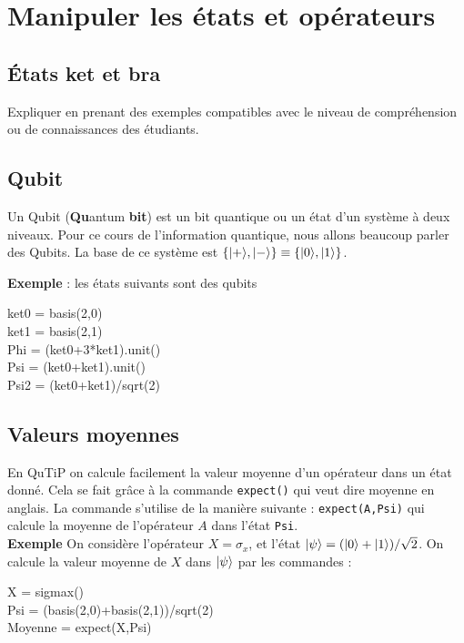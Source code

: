 \section{Manipuler les états et opérateurs}

\subsection{États ket et bra}

Expliquer en prenant des exemples compatibles avec le niveau de compréhension
ou de connaissances des étudiants.

\subsection{Qubit}

Un Qubit (\textbf{Qu}antum \textbf{bit}) est un bit quantique ou un état d'un système à deux niveaux. Pour ce cours de l'information quantique, nous allons beaucoup parler des Qubits. La base de ce système est $\{\vert+\rangle,\vert-\rangle\}\equiv\{\vert0\rangle,\vert1\rangle\}$.

\textbf{Exemple} : les états suivants sont des qubits\\
\begin{tt}
ket0 = basis(2,0) \\
ket1 = basis(2,1)\\
Phi = (ket0+3*ket1).unit()\\
Psi = (ket0+ket1).unit()\\
Psi2 = (ket0+ket1)/sqrt(2)\\
\end{tt}

\subsection{Valeurs moyennes}

En QuTiP on calcule facilement la valeur moyenne d'un opérateur dans un état donné. Cela se fait grâce à la commande \texttt{expect()} qui veut dire moyenne en anglais. La commande s'utilise de la manière suivante : \texttt{expect(A,Psi)} qui calcule la moyenne de l'opérateur $A$ dans l'état \texttt{Psi}.\\
\textbf{Exemple}
On considère l'opérateur $X=\sigma_x$, et l'état $\vert\psi\rangle=(\vert0\rangle+\vert1\rangle)/\sqrt{2}$. On calcule la valeur moyenne de $X$ dans $\vert\psi\rangle$ par les commandes :\\
\begin{tt}
X = sigmax()\\
Psi = (basis(2,0)+basis(2,1))/sqrt(2)\\
Moyenne = expect(X,Psi)\\
\end{tt}

